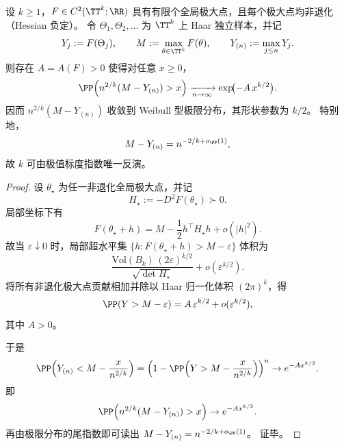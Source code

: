 \begin{conclusion}\label{con:conclusion-torus-dimension-extreme-index}
设 \(k\ge 1\)，\(F\in C^2(\TT^k;\RR)\) 具有有限个全局极大点，且每个极大点均非退化（Hessian 负定）。
令 \(\Theta_1,\Theta_2,\dots\) 为 \(\TT^k\) 上 Haar 独立样本，并记
\[
Y_j:=F(\Theta_j),\qquad
M:=\max_{\theta\in\TT^k}F(\theta),\qquad
Y_{(n)}:=\max_{j\le n}Y_j.
\]
则存在 \(A=A(F)>0\) 使得对任意 \(x\ge 0\)，
\[
\PP\!\left(n^{2/k}(M-Y_{(n)})>x\right)
\xrightarrow[n\to\infty]{}
\exp\!\bigl(-A\,x^{k/2}\bigr).
\]
因而 \(n^{2/k}(M-Y_{(n)})\) 收敛到 Weibull 型极限分布，其形状参数为 \(k/2\)。
特别地，
\[
M-Y_{(n)}=n^{-2/k+o_{\PP}(1)},
\]
故 \(k\) 可由极值标度指数唯一反演。
\end{conclusion}
\begin{proof}
设 \(\theta_\star\) 为任一非退化全局极大点，并记
\[
H_\star:=-D^2F(\theta_\star)\succ 0.
\]
局部坐标下有
\[
F(\theta_\star+h)=M-\frac12 h^\top H_\star h+o(|h|^2).
\]
故当 \(\varepsilon\downarrow 0\) 时，局部超水平集
\(
\{h: F(\theta_\star+h)>M-\varepsilon\}
\)
体积为
\[
\frac{\mathrm{Vol}(B_k)\,(2\varepsilon)^{k/2}}{\sqrt{\det H_\star}}
+o(\varepsilon^{k/2}).
\]
将所有非退化极大点贡献相加并除以 Haar 归一化体积 \((2\pi)^k\)，得
\[
\PP(Y>M-\varepsilon)=A\,\varepsilon^{k/2}+o(\varepsilon^{k/2}),
\]
其中 \(A>0\)。

于是
\[
\PP\!\left(Y_{(n)}<M-\frac{x}{n^{2/k}}\right)
=\left(1-\PP\!\left(Y>M-\frac{x}{n^{2/k}}\right)\right)^n
\to e^{-A x^{k/2}}.
\]
即
\[
\PP\!\left(n^{2/k}(M-Y_{(n)})>x\right)\to e^{-A x^{k/2}}.
\]
再由极限分布的尾指数即可读出
\(
M-Y_{(n)}=n^{-2/k+o_{\PP}(1)}
\)。
证毕。
\end{proof}

